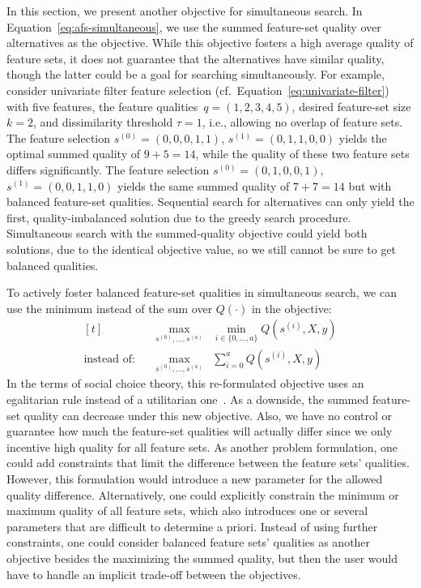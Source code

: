 \documentclass{article}
\theoremstyle{definition}
\begin{document}
In this section, we present another objective for simultaneous search.
In Equation~\ref{eq:afs-simultaneous}, we use the summed feature-set quality over alternatives as the objective.
While this objective fosters a high average quality of feature sets, it does not guarantee that the alternatives have similar quality, though the latter could be a goal for searching simultaneously.
For example, consider univariate filter feature selection (cf.~Equation~\ref{eq:univariate-filter}) with five features, the feature qualities~$q = (1,2,3,4,5)$, desired feature-set size $k=2$, and dissimilarity threshold $\tau = 1$, i.e., allowing no overlap of feature sets.
The feature selection $s^{(0)} = (0,0,0,1,1)$, $s^{(1)} = (0,1,1,0,0)$ yields the optimal summed quality of $9+5=14$, while the quality of these two feature sets differs significantly.
The feature selection $s^{(0)} = (0,1,0,0,1)$, $s^{(1)} = (0,0,1,1,0)$ yields the same summed quality of $7+7=14$ but with balanced feature-set qualities.
Sequential search for alternatives can only yield the first, quality-imbalanced solution due to the greedy search procedure.
Simultaneous search with the summed-quality objective could yield both solutions, due to the identical objective value, so we still cannot be sure to get balanced qualities.

To actively foster balanced feature-set qualities in simultaneous search, we can use the minimum instead of the sum over $Q(\cdot)$ in the objective:
%
\begin{equation}
	\begin{aligned}[t]
		&\quad \max_{s^{(0)}, \dots, s^{(a)}} & \min_{i \in \{0, \dots, a\}} Q(s^{(i)},X,y) \\
		\text{instead of:} &\quad \max_{s^{(0)}, \dots, s^{(a)}} & \sum_{i=0}^a Q(s^{(i)},X,y)
	\end{aligned}
	\label{eq:afs-simultaneous-min-objective}
\end{equation}
%
In the terms of social choice theory, this re-formulated objective uses an egalitarian rule instead of a utilitarian one~\cite{myerson1981utilitarianism}.
As a downside, the summed feature-set quality can decrease under this new objective.
Also, we have no control or guarantee how much the feature-set qualities will actually differ since we only incentive high quality for all feature sets.
As another problem formulation, one could add constraints that limit the difference between the feature sets' qualities.
However, this formulation would introduce a new parameter for the allowed quality difference.
Alternatively, one could explicitly constrain the minimum or maximum quality of all feature sets, which also introduces one or several parameters that are difficult to determine a priori.
Instead of using further constraints, one could consider balanced feature sets' qualities as another objective besides the maximizing the summed quality, but then the user would have to handle an implicit trade-off between the objectives.
\end{document}
